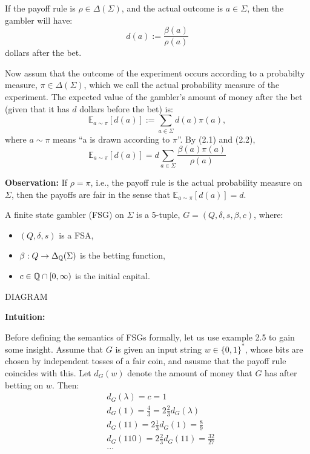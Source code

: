 \documentclass[../main.tex]{subfiles}
\begin{document}
    If the payoff rule is $\rho \in \Delta(\Sigma)$, and the actual outcome is
$a \in \Sigma$, then the gambler will have:
\begin{equation}
    d(a) := \frac{\beta(a)}{\rho(a)}
\end{equation}
dollars after the bet.

    Now assum that the outcome of the experiment occurs according to a probabilty
measure, $\pi \in \Delta(\Sigma)$, which we call the actual probability measure
of the experiment. The expected value of the gambler's amount of money after the
bet (given that it has $d$ dollars before the bet) is:
\begin{equation}
    \mathbb{E}_{a\sim\pi}[d(a)] := \sum_{a \in \Sigma} d(a)\pi(a),
\end{equation}
where $a\sim\pi$ means ``a is drawn according to $\pi$''. By (2.1) and (2.2),
\begin{equation}
    \mathbb{E}_{a\sim\pi}[d(a)] = d \sum_{a \in \Sigma} \frac{\beta(a)\pi(a)}{\rho(a)}
\end{equation}

\textbf{Observation:}
If $\rho = \pi$, i.e., the payoff rule is the actual probability measure on $\Sigma$,
then the payoffs are fair in the sense that $\mathbb{E}_{a \sim \pi}[d(a)] = d$.

\begin{defn}
    A finite state gambler (FSG) on $\Sigma$ is a 5-tuple, $G = (Q, \delta, s, \beta, c)$, where:
    \begin{itemize}
        \item $(Q, \delta, s)$ is a FSA,
        \item $\beta: Q \rightarrow \Delta_{\mathbb{Q}}(\Sigma)$ is the betting function,
        \item $c \in \mathbb{Q} \cap [0, \infty)$ is the initial capital.
    \end{itemize}
\end{defn}

\begin{exmp}
    DIAGRAM
\end{exmp}

\textbf{Intuition:}

    Before defining the semantics of FSGs formally, let us use example 2.5 to
gain some insight. Assume that $G$ is given an input string $w \in \{0, 1\}^{*}$,
whose bits are chosen by independent tosses of a fair coin, and asusme that the
payoff rule coincides with this. Let $d_{G}(w)$ denote the amount of money that
$G$ has after betting on $w$. Then:
\begin{align*}
    & d_{G}(\lambda) = c = 1 \\
    & d_{G}(1) = \frac{4}{3} = 2\frac{2}{3}d_{G}(\lambda) \\
    & d_{G}(11) = 2\frac{1}{3}d_{G}(1) = \frac{8}{9} \\
    & d_{G}(110) = 2\frac{2}{3}d_{G}(11) = \frac{32}{27} \\
    & ...
\end{align*}
\end{document}
